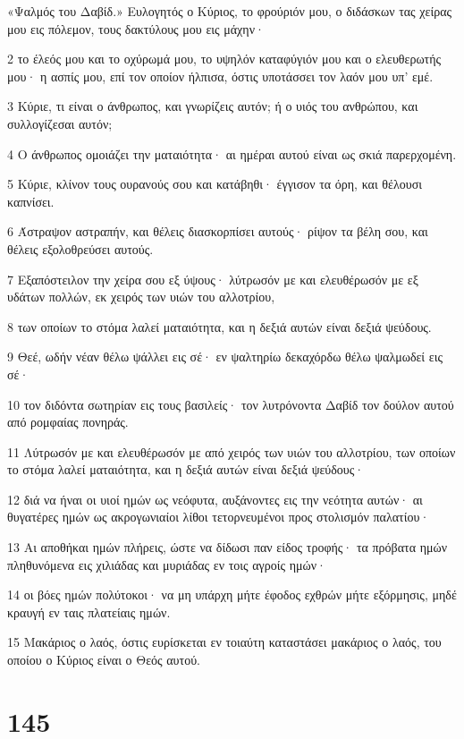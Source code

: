 \par «Ψαλμός του Δαβίδ.» Ευλογητός ο Κύριος, το φρούριόν μου, ο διδάσκων τας χείρας μου εις πόλεμον, τους δακτύλους μου εις μάχην·
\par 2 το έλεός μου και το οχύρωμά μου, το υψηλόν καταφύγιόν μου και ο ελευθερωτής μου· η ασπίς μου, επί τον οποίον ήλπισα, όστις υποτάσσει τον λαόν μου υπ' εμέ.
\par 3 Κύριε, τι είναι ο άνθρωπος, και γνωρίζεις αυτόν; ή ο υιός του ανθρώπου, και συλλογίζεσαι αυτόν;
\par 4 Ο άνθρωπος ομοιάζει την ματαιότητα· αι ημέραι αυτού είναι ως σκιά παρερχομένη.
\par 5 Κύριε, κλίνον τους ουρανούς σου και κατάβηθι· έγγισον τα όρη, και θέλουσι καπνίσει.
\par 6 Άστραψον αστραπήν, και θέλεις διασκορπίσει αυτούς· ρίψον τα βέλη σου, και θέλεις εξολοθρεύσει αυτούς.
\par 7 Εξαπόστειλον την χείρα σου εξ ύψους· λύτρωσόν με και ελευθέρωσόν με εξ υδάτων πολλών, εκ χειρός των υιών του αλλοτρίου,
\par 8 των οποίων το στόμα λαλεί ματαιότητα, και η δεξιά αυτών είναι δεξιά ψεύδους.
\par 9 Θεέ, ωδήν νέαν θέλω ψάλλει εις σέ· εν ψαλτηρίω δεκαχόρδω θέλω ψαλμωδεί εις σέ·
\par 10 τον διδόντα σωτηρίαν εις τους βασιλείς· τον λυτρόνοντα Δαβίδ τον δούλον αυτού από ρομφαίας πονηράς.
\par 11 Λύτρωσόν με και ελευθέρωσόν με από χειρός των υιών του αλλοτρίου, των οποίων το στόμα λαλεί ματαιότητα, και η δεξιά αυτών είναι δεξιά ψεύδους·
\par 12 διά να ήναι οι υιοί ημών ως νεόφυτα, αυξάνοντες εις την νεότητα αυτών· αι θυγατέρες ημών ως ακρογωνιαίοι λίθοι τετορνευμένοι προς στολισμόν παλατίου·
\par 13 Αι αποθήκαι ημών πλήρεις, ώστε να δίδωσι παν είδος τροφής· τα πρόβατα ημών πληθυνόμενα εις χιλιάδας και μυριάδας εν τοις αγροίς ημών·
\par 14 οι βόες ημών πολύτοκοι· να μη υπάρχη μήτε έφοδος εχθρών μήτε εξόρμησις, μηδέ κραυγή εν ταις πλατείαις ημών.
\par 15 Μακάριος ο λαός, όστις ευρίσκεται εν τοιαύτη καταστάσει μακάριος ο λαός, του οποίου ο Κύριος είναι ο Θεός αυτού.

\chapter{145}


